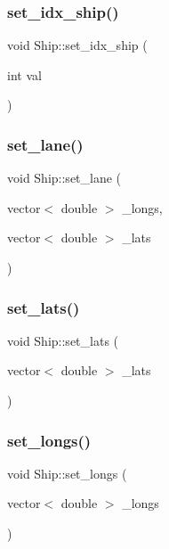 \subsubsection{\texorpdfstring{set\_idx\_ship()}{set\_idx\_ship()}}
{\footnotesize\ttfamily void Ship\+::set\+\_\+idx\+\_\+ship (\begin{DoxyParamCaption}\item[{int}]{val }\end{DoxyParamCaption})}

\mbox{\label{class_ship_a53699692b9cb3fa78cbe05c5e6d0f5e8}} 
\subsubsection{\texorpdfstring{set\_lane()}{set\_lane()}}
{\footnotesize\ttfamily void Ship\+::set\+\_\+lane (\begin{DoxyParamCaption}\item[{vector$<$ double $>$}]{\+\_\+longs,  }\item[{vector$<$ double $>$}]{\+\_\+lats }\end{DoxyParamCaption})}

\mbox{\label{class_ship_afa49566bec8c627b559d81d2ae8aee2a}} 
\subsubsection{\texorpdfstring{set\_lats()}{set\_lats()}}
{\footnotesize\ttfamily void Ship\+::set\+\_\+lats (\begin{DoxyParamCaption}\item[{vector$<$ double $>$}]{\+\_\+lats }\end{DoxyParamCaption})}

\mbox{\label{class_ship_ae2ad397d3d52205c5cf9ee0f19ad2b12}} 
\subsubsection{\texorpdfstring{set\_longs()}{set\_longs()}}
{\footnotesize\ttfamily void Ship\+::set\+\_\+longs (\begin{DoxyParamCaption}\item[{vector$<$ double $>$}]{\+\_\+longs }\end{DoxyParamCaption})}

